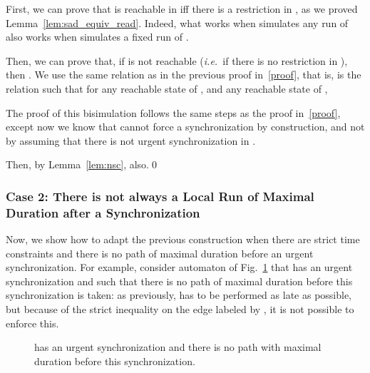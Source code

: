 \documentclass{LMCS}
\theoremstyle{plain}\newtheorem*{prop11}{Proposition~\ref{prop:states} bis}
\def\ie{{\em i.e.\ }}
\begin{document}
  First, we can prove that
   is reachable in  iff there is a restriction
  in , as we proved Lemma~\ref{lem:sad_equiv_read}.
  Indeed, what works when  simulates any run of  also
  works when  simulates a fixed run of .

  Then, we can prove that, if  is not reachable (\ie if there is
  no restriction in ),
  then .
  We use the same relation  as in the previous proof in~\ref{proof},
  that is,  is the relation such that for any reachable state  of
  , and any reachable state  of ,
  
  The proof of this bisimulation follows the same steps as the proof in~\ref{proof},
  except now we know that  cannot force a synchronization by construction,
  and not by assuming that there is not urgent synchronization in .

  Then, by Lemma~\ref{lem:nsc}, 
  also.\qed


\subsubsection*{Case 2: There is not always a Local Run of Maximal Duration after a Synchronization}
Now, we show how to adapt the previous construction when there are strict time
constraints and there is no path of maximal duration before an urgent
synchronization. For example, consider automaton  of Fig.~\ref{fig:urgent2}
that has an urgent synchronization and such that there is no path of maximal duration
before this synchronization is taken: as previously,  has to be performed
as late as possible, but because of the strict inequality  on the edge
labeled by , it is not possible to enforce this.

\begin{figure}[t]
  \centering
  \def\b{3.7}
  \caption{ has an urgent synchronization and there is no path with
  maximal duration before this synchronization.}\label{fig:urgent2}
\end{figure}
\end{document}
